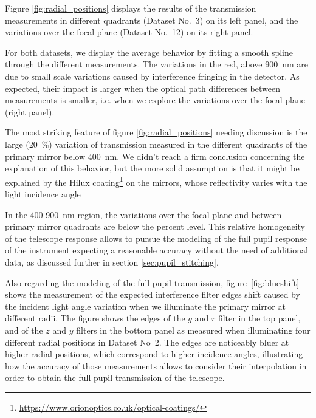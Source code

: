 Figure \ref {fig:radial_positions} displays the results of the transmission measurements in different quadrants (Dataset No.~3) on its left panel, and the variations over the focal plane (Dataset No.~12) on its right panel.

For both datasets, we display the average behavior by fitting a smooth spline through the different measurements. The variations in the red, above \SI{900}{\nano\meter} are due to small scale variations caused by interference fringing in the detector. As expected, their impact is larger when the optical path differences between measurements is smaller, i.e. when we explore the variations over the focal plane (right panel).

The most striking feature of figure \ref{fig:radial_positions} needing discussion is the large (\SI{20}{\%}) variation of transmission measured in the different quadrants of the primary mirror below \SI{400}{\nano\meter}. We didn't reach a firm conclusion concerning the explanation of this behavior, but the more solid assumption is that it might be explained by the Hilux coating\footnote{\url{https://www.orionoptics.co.uk/optical-coatings/}} on the \SD mirrors, whose reflectivity varies with the light incidence angle

In the 400-\SI{900}{\nano\meter} region, the variations over the focal plane and
between primary mirror quadrants are below the percent level. This relative
homogeneity of the telescope response allows to pursue the modeling of the full
pupil response of the instrument expecting a reasonable accuracy without the
need of additional data, as discussed further in section
\ref{sec:pupil_stitching}.

Also regarding the modeling of the full pupil transmission,
figure~\ref{fig:blueshift} shows the measurement of the expected interference
filter edges shift caused by the incident light angle variation when we
illuminate the primary mirror at different radii. The figure shows the edges of
the $g$ and $r$ filter in the top panel, and of the $z$ and $y$ filters in the
bottom panel as measured when illuminating four different radial positions in
Dataset No~2. The edges are noticeably bluer at higher radial positions, which
correspond to higher incidence angles, illustrating how the accuracy of those
measurements allows to consider their interpolation in order to obtain the full
pupil transmission of the telescope.



